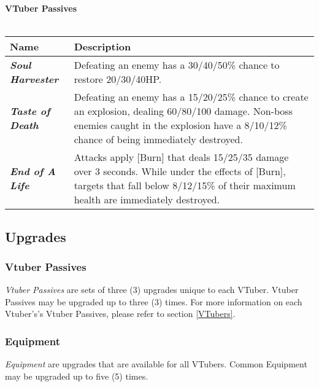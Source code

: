 \documentclass[10pt, a4paper]{article}
\begin{document}
  	\noindent\textbf{VTuber Passives}\\\\
  	\begin{supertabular}{p{2.7cm} p{6cm}}
  		\hline
  		\textbf{Name}                    & \textbf{Description}                                                                                                                                                                           \\ \hline
  		\textit{\textbf{Soul Harvester}} & Defeating an enemy has a 30/40/50\% chance to restore 20/30/40HP.                                                                                                                              \\
  		\textit{\textbf{Taste of Death}} & Defeating an enemy has a 15/20/25\% chance to create an explosion, dealing 60/80/100 damage. Non-boss enemies caught in the explosion have a 8/10/12\% chance of being immediately destroyed.   \\
  		\textit{\textbf{End of A Life}}  & Attacks apply {[}Burn{]} that deals 15/25/35 damage over 3 seconds. While under the effects of {[}Burn{]}, targets that fall below 8/12/15\% of their maximum health are immediately destroyed. \\ \hline
  	\end{supertabular}
  	\subsection{Upgrades} \label{Upgrades}
  	
  	\subsubsection{Vtuber Passives}
  	
  	\textit{Vtuber Passives} are sets of three (3) upgrades unique to each VTuber. Vtuber Passives may be upgraded up to three (3) times. For more information on each Vtuber's's Vtuber Passives, please refer to section \ref{VTubers}.
  	
  	\subsubsection{Equipment}
  	
  	\textit{Equipment} are upgrades that are available for all VTubers. Common Equipment may be upgraded up to five (5) times.
  	
\end{document}
